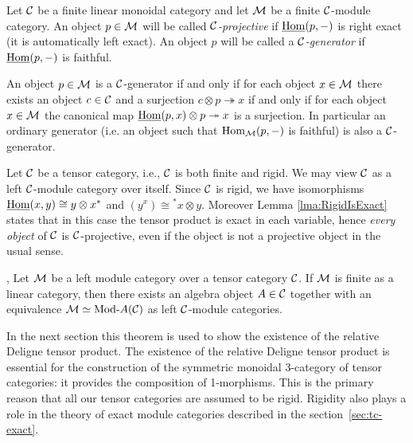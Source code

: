 \documentclass{amsart}
\begin{document}
\begin{definition}
	Let $\mathcal C$ be a finite linear monoidal category and let $\mathcal M$ be a finite $\mathcal C$-module category. An object $p \in \mathcal M$ will be called {\em $\mathcal C$-projective} if $\operatorname{\underline{Hom}}(p, -)$ is right exact (it is automatically left exact). An object $p$ will be called a {\em $\mathcal C$-generator} if $\operatorname{\underline{Hom}}(p,-)$ is faithful. %
\end{definition}

\begin{remark}
	An object $p \in \mathcal M$ is a $\mathcal C$-generator if and only if for each object $x \in \mathcal M$ there exists an object $c \in \mathcal C$ and a surjection $c \otimes p \twoheadrightarrow x$ if and only if for each object $x \in \mathcal M$ the canonical map $\operatorname{\underline{Hom}}(p,x) \otimes p \twoheadrightarrow x$ is a surjection. In particular an ordinary generator (i.e. an object such that $\operatorname{Hom}_\mathcal M(p,-)$ is faithful) is also a $\mathcal C$-generator. 
\end{remark}

\begin{example} \label{ex:rigid_all_C-proj}
	Let $\mathcal C$ be a tensor category, i.e., $\mathcal C$ is both finite and rigid. We may view $\mathcal C$ as a left $\mathcal C$-module category over itself. Since $\mathcal C$ is rigid, we have isomorphisms $\operatorname{\underline{Hom}}(x,y) \cong y \otimes x^*$ and $(y^x) \cong {}^*x \otimes y$. Moreover Lemma \ref{lma:RigidIsExact} states that in this case the tensor product is exact in each variable, hence {\em every object} of $\mathcal C$ is $\mathcal C$-projective, even if the object is not a projective object in the usual sense. %
\end{example}


\begin{theorem}{\cite[Thm 2.11.6]{EGNO}, \cite[Thm 1]{MR1976459}} \label{thm:EGNO2.11.6}
	Let $\mathcal M$ be a left module category over a tensor category $\mathcal C$. If $\mathcal M$ is finite as a linear category, then there exists an algebra object $A \in \mathcal C$ together with an equivalence $\cM \simeq \Mod{}{A} (\cC)$ as left $\mathcal C$-module categories.
\end{theorem}

In the next section this theorem is used to show the existence of the relative Deligne tensor product. The existence of the relative Deligne tensor product is essential for the construction of the symmetric monoidal 3-category of tensor categories: it provides the composition of 1-morphisms. This is the primary reason that all our tensor categories are assumed to be rigid. Rigidity also plays a role in the theory of exact module categories described in the section~\ref{sec:tc-exact}.
\end{document}
